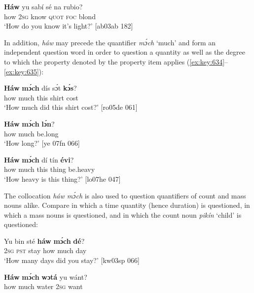 \ea%
    \label{ex:key:632}
    \gll \textbf{Háw}  yu  sabí    sé    na  rubio?\\
how    \textsc{2sg}  know  \textsc{quot}    \textsc{foc}  blond\\

\glt ‘How do you know it’s light?’ [ab03ab 182]
\z

In addition, \textit{háw} may precede the quantifier \textit{mɔ́ch} ‘much’ and form an independent question word in order to question a quantity  as well as the degree to which the property denoted by the property item applies (\ref{ex:key:634}–\ref{ex:key:635}):


\ea%
    \label{ex:key:633}
    \gll \textbf{Háw}  \textbf{mɔ́ch}  dís  sɔ́t    \textbf{kɔ́s}?\\
how    much  this  shirt  cost\\

\glt ‘How much did this shirt cost?’ [ro05de 061]
\z


\ea%
    \label{ex:key:634}
    \gll \textbf{Háw}  \textbf{mɔ́ch}  \textbf{lɔ́n}?\\
how    much  be.long\\

\glt ‘How long?’ [ye 07fn 066]
\z


\ea%
    \label{ex:key:635}
    \gll \textbf{Háw}  \textbf{mɔ́ch}  dí  tín    \textbf{évi}?\\
how    much  this  thing  be.heavy\\

\glt ‘How heavy is this thing?’ [lo07he 047]
\z

The collocation \textit{háw mɔ́ch} is also used to question quantifiers of count and mass nouns alike. Compare  in which a time quantity (hence duration) is questioned,  in which a mass nouns is questioned, and  in which the count noun \textit{pikín} ‘child’ is questioned: 


\ea%
    \label{ex:key:636}
    \gll Yu  bin  sté    \textbf{háw}    \textbf{mɔ́ch}  \textbf{dé}?\\
\textsc{2sg}  \textsc{pst}  stay    how    much  day\\

\glt ‘How many days did you stay?’ [kw03sp 066]
\z


\ea%
    \label{ex:key:637}
    \gll \textbf{Háw}  \textbf{mɔ́ch}  \textbf{wɔtá} yu  wánt?\\
how    much  water  \textsc{2sg}  want\\

